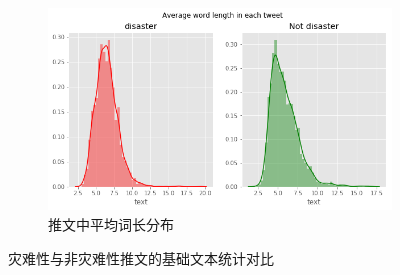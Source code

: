 \begin{figure}[H]
\begin{subfigure}[b]{0.48\textwidth}
        \centering
        \includegraphics[width=\textwidth]{figures/LSTM4.png}
        \caption{推文中平均词长分布}
        \label{fig:avg_word_len}
    \end{subfigure}
    \caption{灾难性与非灾难性推文的基础文本统计对比}
    \label{fig:lstm_eda_basic}
\end{figure}

